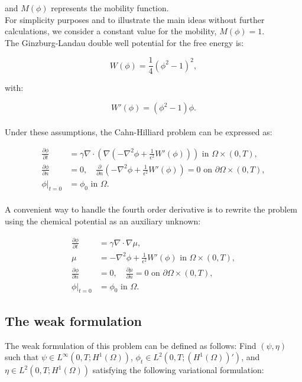 \documentclass{article}
\begin{document}
and $M(\phi)$ represents the mobility function.\\

For simplicity purposes and to illustrate the main ideas without further calculations, we consider a constant value for the mobility, $M(\phi) = 1$.\\

The Ginzburg-Landau double well potential for the free energy is:

\begin{equation}
W(\phi) = \frac{1}{4}(\phi^2 - 1)^2,
\end{equation}

with:

\begin{equation}
W'(\phi) = (\phi^2 - 1)\phi.
\end{equation}\\


Under these assumptions, the Cahn-Hilliard problem can be expressed as:

\begin{align}
\frac{\partial\phi}{\partial t} &= \gamma \nabla \cdot \left(\nabla \left(- \nabla^2 \phi + \frac{1}{\epsilon^2} W'(\phi)\right)\right) \text{ in } \Omega \times (0, T), \\
\frac{\partial\phi}{\partial n} &= 0, \quad \frac{\partial}{\partial n}\left(- \nabla^2 \phi + \frac{1}{\epsilon^2} W'(\phi)\right) = 0 \text{ on } \partial\Omega \times (0, T), \\
\phi|_{t=0} &= \phi_0 \text{ in } \Omega.
\end{align}\\

A convenient way to handle the fourth order derivative is to rewrite the problem using the chemical potential as an auxiliary unknown:

\begin{align}
\frac{\partial\phi}{\partial t} &= \gamma \nabla \cdot \nabla \mu, \\
\mu &= - \nabla^2 \phi + \frac{1}{\epsilon^2} W'(\phi) \text{ in } \Omega \times (0, T), \\
\frac{\partial\phi}{\partial n} &= 0, \quad \frac{\partial \mu}{\partial n} = 0 \text{ on } \partial\Omega \times (0, T), \\
\phi|_{t=0} &= \phi_0 \text{ in } \Omega.
\end{align}

\subsection{The weak formulation}
The weak formulation of this problem can be defined as follows: Find $(\psi, \eta)$ such that $\psi \in L^\infty(0, T; H^1(\Omega))$, $\phi_t \in L^2(0, T; (H^1(\Omega))')$, and $\eta \in L^2(0, T; H^1(\Omega))$ satisfying the following variational formulation:
\end{document}
